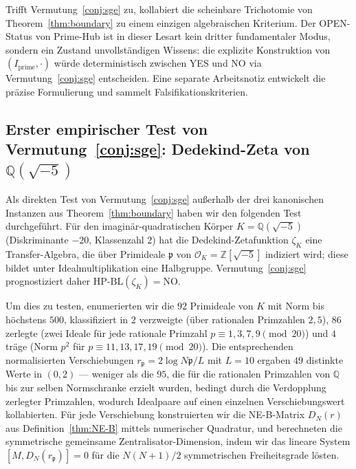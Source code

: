 \documentclass[11pt]{article}
\theoremstyle{definition}
\theoremstyle{remark}
\newcommand{\HBL}{\mathrm{HP\text{-}BL}}
\begin{document}
Trifft Vermutung~\ref{conj:sge} zu, kollabiert die scheinbare Trichotomie
von Theorem~\ref{thm:boundary} zu einem einzigen algebraischen Kriterium.
Der OPEN-Status von Prime-Hub ist in dieser Lesart kein dritter
fundamentaler Modus, sondern ein Zustand unvollständigen Wissens: die explizite
Konstruktion von $(I_\mathrm{prime}, \cdot)$ würde deterministisch zwischen
YES und NO via Vermutung~\ref{conj:sge} entscheiden. Eine separate
Arbeitsnotiz \cite{SGENote} entwickelt die präzise Formulierung und
sammelt Falsifikationskriterien.

\subsection[Erster empirischer Test von Vermutung: Dedekind-Zeta von Q(sqrt(-5))]{Erster empirischer Test von Vermutung~\ref{conj:sge}:
Dedekind-Zeta von \texorpdfstring{$\mathbb{Q}(\sqrt{-5})$}{Q(sqrt(-5))}}
\label{sec:sge-dedekind-test}

Als direkten Test von Vermutung~\ref{conj:sge} außerhalb der drei kanonischen
Instanzen aus Theorem~\ref{thm:boundary} haben wir den folgenden Test
\cite{DedekindNEBTest} durchgeführt. Für den imaginär-quadratischen Körper
$K = \mathbb{Q}(\sqrt{-5})$ (Diskriminante $-20$, Klassenzahl $2$) hat die
Dedekind-Zetafunktion $\zeta_K$ eine Transfer-Algebra, die über
Primideale $\mathfrak{p}$ von $\mathcal{O}_K = \mathbb{Z}[\sqrt{-5}]$ indiziert
wird; diese bildet unter Idealmultiplikation eine Halbgruppe.
Vermutung~\ref{conj:sge} prognostiziert daher $\HBL(\zeta_K) = \mathrm{NO}$.

Um dies zu testen, enumerierten wir die $92$ Primideale von $K$ mit Norm bis
höchstens $500$, klassifiziert in $2$ verzweigte (über rationalen Primzahlen $2, 5$),
$86$ zerlegte (zwei Ideale für jede rationale Primzahl $p \equiv 1, 3, 7,
9 \pmod{20}$) und $4$ träge (Norm $p^2$ für $p \equiv 11, 13, 17,
19 \pmod{20}$). Die entsprechenden normalisierten Verschiebungen $r_\mathfrak{p}
= 2\log N\mathfrak{p}/L$ mit $L = 10$ ergaben $49$ distinkte Werte
in $(0, 2)$ --- weniger als die $95$, die für die rationalen Primzahlen
von $\mathbb{Q}$ bis zur selben Normschranke erzielt wurden, bedingt durch die Verdopplung
zerlegter Primzahlen, wodurch Idealpaare auf einen einzelnen Verschiebungswert kollabierten.
Für jede Verschiebung konstruierten wir die NE-B-Matrix $D_N(r)$ aus Definition~\ref{thm:NE-B}
mittels numerischer Quadratur, und berechneten die symmetrische gemeinsame
Zentralisator-Dimension, indem wir das lineare System
$[M, D_N(r_\mathfrak{p})] = 0$ für die $N(N+1)/2$ symmetrischen
Freiheitsgrade lösten.
\end{document}
